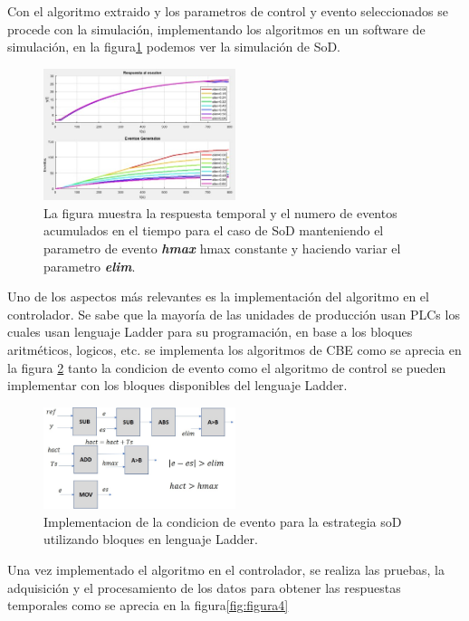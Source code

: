 \documentclass[conference]{IEEEtran}
\begin{document}
Con el algoritmo extraido y los parametros de control y evento seleccionados se procede con la simulaci\'on, implementando los algoritmos en un software de simulaci\'on, en la figura\ref{fig:figura2} podemos ver la simulaci\'on de SoD.
\begin{figure}[h]
    \centering
    \includegraphics[width=0.5\textwidth]{sim_sod}
    \caption{La figura muestra la respuesta temporal y el numero de eventos acumulados en el tiempo para el caso de SoD manteniendo el parametro de evento \textbf{\textit{hmax}} hmax constante y haciendo variar el parametro \textbf{\textit{elim}}.}
    \label{fig:figura2}
\end{figure}
Uno de los aspectos más relevantes es la implementaci\'on del algoritmo en el controlador. Se sabe que la mayor\'ia de las unidades de producci\'on usan PLCs los cuales usan lenguaje Ladder para su programaci\'on, en base a los bloques aritm\'eticos, logicos, etc. se implementa los algoritmos de CBE como se aprecia en la figura \ref{fig:figura3} tanto la condicion de evento como el algoritmo de control se pueden implementar con los bloques disponibles del lenguaje Ladder.
\begin{figure}[h]
    \centering
    \includegraphics[width=0.5\textwidth]{ladderevent}
    \caption{Implementacion de la condicion de evento para la estrategia soD utilizando bloques en lenguaje Ladder.}
    \label{fig:figura3}
\end{figure}
Una vez implementado el algoritmo en el controlador, se realiza las pruebas, la adquisici\'on  y el procesamiento de los datos para obtener las respuestas temporales como se aprecia en la figura\ref{fig:figura4}
\end{document}
